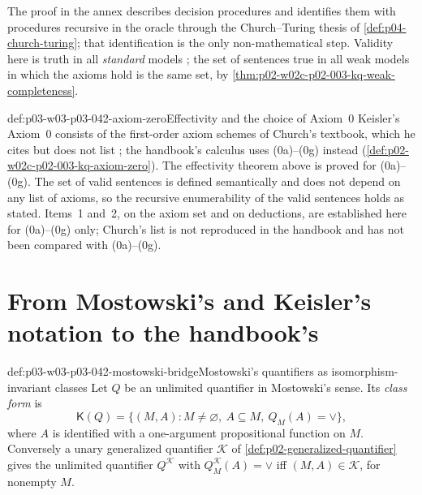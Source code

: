 The proof in the annex describes decision procedures and identifies them
with procedures recursive in the oracle through the Church--Turing thesis
of \cref{def:p04-church-turing}; that identification is the only
non-mathematical step.  Validity here is truth in all \emph{standard}
models \cite[\S2, p.~26]{Keisler1970}; the set of sentences true in all
weak models in which the axioms hold is the same set, by
\cref{thm:p02-w02c-p02-003-kq-weak-completeness}.

\begin{hbwarning}{def:p03-w03-p03-042-axiom-zero}{Effectivity and the choice of Axiom~0}
Keisler's Axiom~0 consists of the first-order axiom schemes of Church's
textbook, which he cites but does not list
\cite[\S1, p.~6]{Keisler1970}; the handbook's calculus uses (0a)--(0g)
instead (\cref{def:p02-w02c-p02-003-kq-axiom-zero}).  The effectivity
theorem above is proved for (0a)--(0g).  The set of valid sentences is
defined semantically and does not depend on any list of axioms, so the
recursive enumerability of the valid sentences holds as stated.  Items~1
and~2, on the axiom set and on deductions, are established here for
(0a)--(0g) only; Church's list is not reproduced in the handbook and has
not been compared with (0a)--(0g).
\end{hbwarning}

\section{From Mostowski's and Keisler's notation to the handbook's}
\label{sec:p03-w03-p03-042-bridge}

\begin{hbconvention}{def:p03-w03-p03-042-mostowski-bridge}{Mostowski's quantifiers as isomorphism-invariant classes}
Let \(Q\) be an unlimited quantifier in Mostowski's sense.  Its
\emph{class form} is
\[
 \mathsf K(Q)=\{(M,A):M\neq\varnothing,\ A\subseteq M,\ Q_M(A)=\vee\},
\]
where \(A\) is identified with a one-argument propositional function on
\(M\).  Conversely a unary generalized quantifier \(\mathcal K\) of
\cref{def:p02-generalized-quantifier} gives the unlimited quantifier
\(Q^{\mathcal K}\) with \(Q^{\mathcal K}_M(A)=\vee\) iff
\((M,A)\in\mathcal K\), for nonempty \(M\).
\end{hbconvention}


